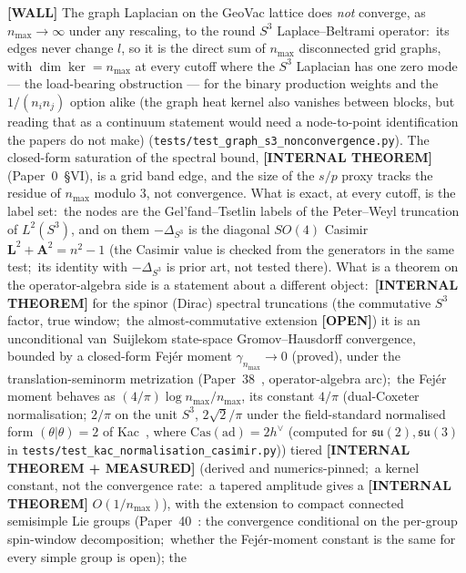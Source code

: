 \documentclass[aps,pra,twocolumn,superscriptaddress,longbibliography]{revtex4-2}
\newcommand{\gvc}[2]{#2}
\begin{document}
\textbf{[WALL]} \gvc{graph-s3-wall}{The graph Laplacian on the GeoVac lattice does \emph{not}
converge, as $n_{\max} \to \infty$ under any rescaling, to the round
$S^3$ Laplace--Beltrami operator:\ its edges never change $l$, so it is
the direct sum of $n_{\max}$ disconnected grid graphs, with
$\dim\ker = n_{\max}$ at every cutoff where the $S^3$ Laplacian has one
zero mode --- the load-bearing obstruction --- for the binary
production weights and the $1/(n_i n_j)$ option alike (the graph heat
kernel also vanishes between blocks, but reading that as a continuum
statement would need a node-to-point identification the papers do not
make)
(\texttt{tests/test\_graph\_s3\_nonconvergence.py})}.  The closed-form
saturation of the spectral bound, \textbf{[INTERNAL THEOREM]}
(Paper~0~\S VI), is a grid band edge, and the size of the $s/p$ proxy
tracks the residue of $n_{\max}$ modulo $3$, not convergence.  What is exact, at every
cutoff, is the label set:\ the nodes are the Gel'fand--Tsetlin labels of
the Peter--Weyl truncation of $L^2(S^3)$, and on them $-\Delta_{S^3}$ is
the diagonal $SO(4)$ Casimir $\mathbf{L}^2 + \mathbf{A}^2 = n^2 - 1$
(the Casimir value is checked from the generators in the same test;\
its identity with $-\Delta_{S^3}$ is prior art, not tested there).  What is a theorem on the
operator-algebra side is a statement about a different object:\ \textbf{[INTERNAL THEOREM]} \gvc{wh1-p38-gh-convergence}{for the spinor (Dirac)
spectral truncations (the commutative $S^3$ factor, true window;\ the
almost-commutative extension \textbf{[OPEN]}) it is an unconditional
van~Suijlekom state-space Gromov--Hausdorff convergence, bounded by a
closed-form Fej\'er moment $\gamma_{n_{\max}} \to 0$ (proved), under the
translation-seminorm metrization (Paper~38~\cite{loutey_paper38},
operator-algebra arc)};\ \gvc{p38-rate-constant}{the Fej\'er moment behaves as
$(4/\pi)\log n_{\max}/n_{\max}$, its constant $4/\pi$ (dual-Coxeter normalisation; $2/\pi$ on the unit $S^3$, $2\sqrt2/\pi$ under the field-standard normalised form $(\theta|\theta) = 2$ of Kac~\cite{kac_infinite1990}, where $\mathrm{Cas}(\mathrm{ad}) = 2h^\vee$ (computed for $\mathfrak{su}(2), \mathfrak{su}(3)$ in \texttt{tests/test\_kac\_normalisation\_casimir.py}))
tiered \textbf{[INTERNAL THEOREM + MEASURED]} (derived and numerics-pinned;\
a kernel constant, not the convergence rate:\ a tapered amplitude gives a \textbf{[INTERNAL THEOREM]} $O(1/n_{\max})$)}, \gvc{p40-general-g-conditional}{with the extension to compact connected
semisimple Lie groups (Paper~40~\cite{loutey_paper40}: the convergence
conditional on the per-group spin-window decomposition;\ whether the
Fej\'er-moment constant is the same for every simple group is open)}; the
\end{document}
